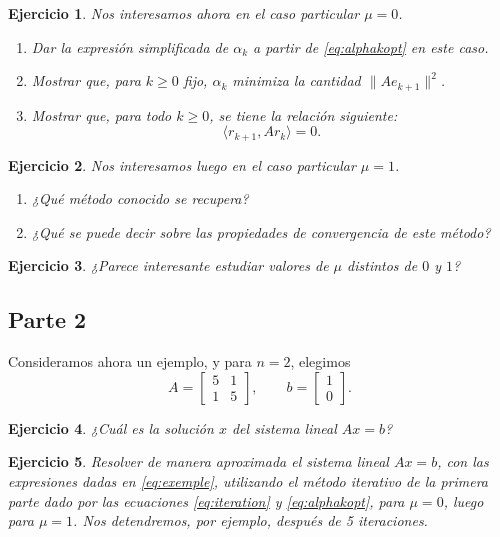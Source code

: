 \documentclass[11pt]{report}
\newtheorem{ex}{Ejercicio}
\begin{document}
\begin{ex}
Nos interesamos ahora en el caso particular $\mu = 0$.
\begin{enumerate}
\item Dar la expresión simplificada de $\alpha_k$ a partir de \eqref{eq:alphakopt} en este caso.

\item Mostrar que, para $k \geq 0$ fijo, $\alpha_k$ minimiza la cantidad $\|A e_{k+1}\|^2$.

\item Mostrar que, para todo $k \geq 0$, se tiene la relación siguiente:
\[
\langle r_{k+1}, A r_k \rangle = 0.
\]
\end{enumerate}
\end{ex}

\begin{ex}
Nos interesamos luego en el caso particular $\mu = 1$.
\begin{enumerate}
\item ¿Qué método conocido se recupera?

\item ¿Qué se puede decir sobre las propiedades de convergencia de este método?
\end{enumerate}
\end{ex}

\begin{ex}
¿Parece interesante estudiar valores de $\mu$ distintos de $0$ y $1$?
\end{ex}

\subsection*{Parte 2}

Consideramos ahora un ejemplo, y para $n=2$, elegimos
\begin{equation}
A = \left[ \begin{array}{cc} 5 & 1 \\ 1 & 5 \end{array} \right], \qquad
b = \left[ \begin{array}{c} 1 \\ 0 \end{array} \right].
\label{eq:exemple}
\end{equation}

\begin{ex}
¿Cuál es la solución $x$ del sistema lineal $A x = b$?
\end{ex}

\begin{ex}
Resolver de manera aproximada el sistema lineal $A x = b$, con las expresiones dadas en \eqref{eq:exemple}, utilizando el método iterativo de la primera parte dado por las ecuaciones \eqref{eq:iteration} y \eqref{eq:alphakopt}, para $\mu = 0$, luego para $\mu = 1$. Nos detendremos, por ejemplo, después de 5 iteraciones.
\end{ex}
\end{document}
